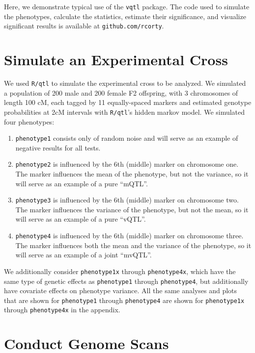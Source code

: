 \documentclass[9pt,twocolumn,twoside]{gsag3jnl}
\begin{document}
Here, we demonstrate typical use of the \texttt{vqtl} package.
The code used to simulate the phenotypes, calculate the statistics, estimate their significance, and visualize significant results is available at \texttt{github.com/rcorty}.




\section*{Simulate an Experimental Cross}

We used \texttt{R/qtl} to simulate the experimental cross to be analyzed.
We simulated a population of 200 male and 200 female F2 offspring, with 3 chromosomes of length 100 cM, each tagged by 11 equally-spaced markers and estimated genotype probabilities at 2cM intervals with \texttt{R/qtl}'s hidden markov model.
We simulated four phenotypes:

\begin{enumerate}
	\item \texttt{phenotype1} consists only of random noise and will serve as an example of negative results for all tests.
	\item \texttt{phenotype2} is influenced by the 6th (middle) marker on chromosome one.  The marker influences the mean of the phenotype, but not the variance, so it will serve as an example of a pure ``mQTL''.
	\item \texttt{phenotype3} is influenced by the 6th (middle) marker on chromosome two.  The marker influences the variance of the phenotype, but not the mean, so it will serve as an example of a pure ``vQTL''.
	\item \texttt{phenotype4} is influenced by the 6th (middle) marker on chromosome three.  The marker influences both the mean and the variance of the phenotype, so it will serve as an example of a joint ``mvQTL''.
\end{enumerate}

We additionally consider \texttt{phenotype1x} through \texttt{phenotype4x}, which have the same type of genetic effects as \texttt{phenotype1} through \texttt{phenotype4}, but additionally have covariate effects on phenotype variance.
All the same analyses and plots that are shown for \texttt{phenotype1} through \texttt{phenotype4} are shown for \texttt{phenotype1x} through \texttt{phenotype4x} in the appendix.




\section*{Conduct Genome Scans}
\end{document}
